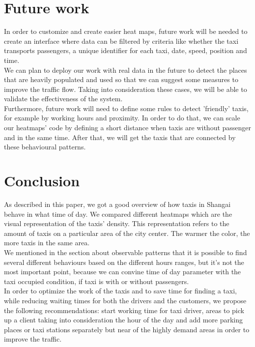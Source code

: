 \documentclass[11pt,conference,a4paper,twocolumns,romanappendices]{IEEEtran}
\begin{document}
\section{Future work}
In order to customize and create easier heat maps, future work will be needed to create an interface where data can be filtered by criteria like whether the taxi transports passengers, a unique identifier for each taxi, date, speed, position and time.  \\
We can plan to deploy our work with real data in the future to detect the places that are heavily populated and used so that we can suggest some measures to improve the traffic flow. Taking into consideration these cases, we will be able to validate the effectiveness of the system. \\
Furthermore, future work will need to define some rules to detect 'friendly' taxis, for example by working hours and proximity. In order to do that, we can scale our heatmaps' code by defining a short distance when taxis are without passenger and in the same time. After that, we will get the taxis that are connected by these behavioural patterns.

\section{Conclusion}
As described in this paper, we got a good overview of how taxis in Shangai behave in what time of day. We compared different heatmaps which are the visual representation of the taxis' density. This representation refers to the amount of taxis on a particular area of the city center. The warmer the color, the more taxis in the same area.
\\
We mentioned in the section about observable patterns that it is possible to find several different behaviours based on the different hours ranges, but it's not the most important point, because we can convine time of day parameter with the taxi occupied condition, if taxi is with or without passengers.
\\
In order to optimize the work of the taxis and to save time for finding a taxi, while reducing waiting times for both the drivers and the customers, we propose the following recommendations: start working time for taxi driver, areas to pick up a client taking into consideration the hour of the day and add more parking places or taxi stations separately but near of the highly demand areas in order to improve the traffic.


\newpage


\end{document}
